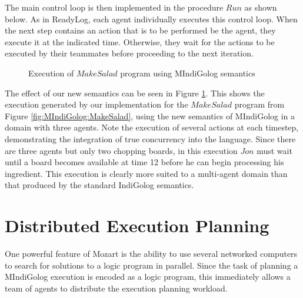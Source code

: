 
The main control loop is then implemented in the procedure $Run$
as shown below. As in ReadyLog, each agent individually executes this
control loop. When the next step contains an action that is to be
performed be the agent, they execute it at the indicated time. Otherwise,
they wait for the actions to be executed by their teammates before
proceeding to the next iteration.


%
\begin{figure}[!b]

\caption{Execution of $MakeSalad$ program using MIndiGolog semantics\label{fig:MIndiGolog:MakeSalad-in-MIndiGolog}}

\end{figure}


The effect of our new semantics can be seen in Figure \ref{fig:MIndiGolog:MakeSalad-in-MIndiGolog}.
This shows the execution generated by our implementation for the $MakeSalad$
program from Figure \ref{fig:MIndiGolog:MakeSalad}, using the new
semantics of MIndiGolog in a domain with three agents. Note the execution
of several actions at each timestep, demonstrating the integration
of true concurrency into the language. Since there are three agents
but only two chopping boards, in this execution $Jon$ must wait until
a board becomes available at time 12 before he can begin processing
his ingredient. This execution is clearly more suited to a multi-agent
domain than that produced by the standard IndiGolog semantics.


\section{Distributed Execution Planning\label{sec:MIndiGolog:Distributed-Planning}}

One powerful feature of Mozart is the ability to use several networked
computers to search for solutions to a logic program in parallel.
Since the task of planning a MIndiGolog execution is encoded as a
logic program, this immediately allows a team of agents to distribute
the execution planning workload.

